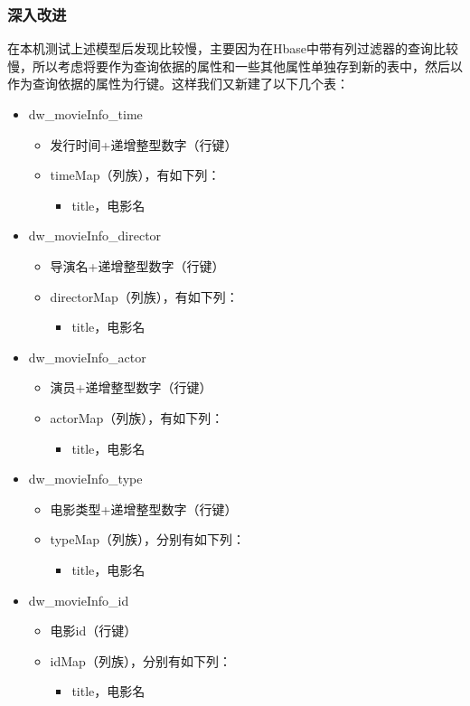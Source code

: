 \documentclass{ctexrep}
\begin{document}
	\subsubsection{深入改进}
	在本机测试上述模型后发现比较慢，主要因为在Hbase中带有列过滤器的查询比较慢，所以考虑将要作为查询依据的属性和一些其他属性单独存到新的表中，然后以作为查询依据的属性为行键。这样我们又新建了以下几个表：
	\begin{itemize}
		\item dw\_movieInfo\_time
			\begin{itemize}
				\item 发行时间+递增整型数字（行键）
				\item timeMap（列族），有如下列：
				\begin{itemize}
					\item title，电影名
				\end{itemize}
			\end{itemize}
		\item dw\_movieInfo\_director
			\begin{itemize}
				\item 导演名+递增整型数字（行键）
				\item directorMap（列族），有如下列：
				\begin{itemize}
					\item title，电影名
				\end{itemize}
			\end{itemize}
		\item dw\_movieInfo\_actor
		\begin{itemize}
			\item 演员+递增整型数字（行键）
			\item actorMap（列族），有如下列：
			\begin{itemize}
				\item title，电影名
			\end{itemize}
		\end{itemize}
		\item dw\_movieInfo\_type
		\begin{itemize}
			\item 电影类型+递增整型数字（行键）
			\item typeMap（列族），分别有如下列：
			\begin{itemize}
				\item title，电影名
			\end{itemize}
		\end{itemize}
		\item dw\_movieInfo\_id
		\begin{itemize}
			\item 电影id（行键）
			\item idMap（列族），分别有如下列：
			\begin{itemize}
				\item title，电影名
			\end{itemize}
		\end{itemize}
	\end{itemize}
\end{document}
